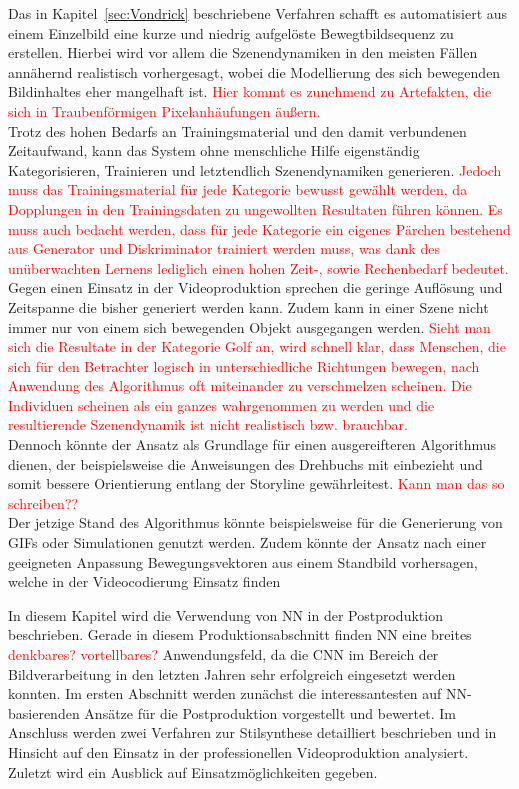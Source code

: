 \documentclass[times, 11pt,twocolumn]{article}
\begin{document}
 \label{sec:VondrickConclusion}
Das in Kapitel~\ref{sec:Vondrick} beschriebene Verfahren schafft es automatisiert aus einem Einzelbild eine kurze und niedrig aufgelöste Bewegtbildsequenz zu erstellen. Hierbei wird vor allem die Szenendynamiken in den meisten Fällen annähernd realistisch vorhergesagt, wobei die Modellierung des sich bewegenden Bildinhaltes eher mangelhaft ist. \textcolor{red}{Hier kommt es zunehmend zu Artefakten, die sich in Traubenförmigen Pixelanhäufungen äußern.} \\
Trotz des hohen Bedarfs an Trainingsmaterial und den damit verbundenen Zeitaufwand, kann das System ohne menschliche Hilfe eigenständig Kategorisieren, Trainieren und letztendlich Szenendynamiken generieren. \textcolor{red}{Jedoch muss das Trainingsmaterial für jede Kategorie bewusst gewählt werden, da Dopplungen in den Trainingsdaten zu ungewollten Resultaten führen können. Es muss auch bedacht werden, dass für jede Kategorie ein eigenes Pärchen bestehend aus Generator und Diskriminator trainiert werden muss, was dank des unüberwachten Lernens lediglich einen hohen Zeit-, sowie Rechenbedarf bedeutet.} \\
 Gegen einen Einsatz in der Videoproduktion sprechen die geringe Auflösung und Zeitspanne die bisher generiert werden kann. Zudem kann in einer Szene nicht immer nur von einem sich bewegenden Objekt ausgegangen werden. \textcolor{red}{Sieht man sich die Resultate in der Kategorie Golf an, wird schnell klar, dass Menschen, die sich für den Betrachter logisch in unterschiedliche Richtungen bewegen, nach Anwendung des Algorithmus oft miteinander zu verschmelzen scheinen. Die Individuen scheinen als ein ganzes wahrgenommen zu werden und die resultierende Szenendynamik ist nicht realistisch bzw. brauchbar.} \\
Dennoch könnte der Ansatz als Grundlage für einen ausgereifteren Algorithmus dienen, der beispielsweise die Anweisungen des Drehbuchs mit einbezieht und somit bessere Orientierung entlang der Storyline gewährleitest. \textcolor{red}{Kann man das so schreiben??}\\
Der jetzige Stand des Algorithmus könnte beispielsweise für die Generierung von GIFs oder Simulationen genutzt werden. Zudem könnte der Ansatz nach einer geeigneten Anpassung Bewegungsvektoren aus einem Standbild vorhersagen, welche in der Videocodierung Einsatz finden




 \label{sec:Postroduktion}
In diesem Kapitel wird die Verwendung von NN in der Postproduktion beschrieben. Gerade in diesem Produktionsabschnitt finden NN eine breites \textcolor{red}{denkbares? vortellbares?} Anwendungsfeld, da die CNN im Bereich der Bildverarbeitung in den letzten Jahren sehr erfolgreich eingesetzt werden konnten. Im ersten Abschnitt werden zunächst die interessantesten auf NN-basierenden Ansätze für die Postproduktion vorgestellt und bewertet. Im Anschluss werden zwei Verfahren zur Stilsynthese detailliert beschrieben und in Hinsicht auf den Einsatz in der professionellen Videoproduktion analysiert. Zuletzt wird ein Ausblick auf Einsatzmöglichkeiten gegeben.
\end{document}
